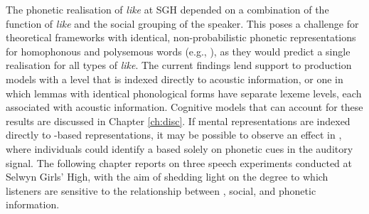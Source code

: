 The phonetic realisation of \textit{like} at SGH depended on a combination of the function of \textit{like} and the social grouping of the speaker. This poses a challenge for theoretical frameworks with identical, non-probabilistic phonetic representations for homophonous and polysemous words (e.g., \citealt{leveltetal1999}), as they would predict a single realisation for all types of \textit{like}. The current findings lend support to production models with a  level that is indexed directly to acoustic information, or one in which lemmas with identical phonological forms have separate lexeme levels, each associated with acoustic information. Cognitive models that can account for these results are discussed in Chapter \ref{ch:disc}. If mental representations are indexed directly to -based representations, it may be possible to observe an effect in , where individuals could identify a  based solely on phonetic cues in the auditory signal. The following chapter reports on three speech  experiments conducted at Selwyn Girls' High, with the aim of shedding light on the degree to which listeners are sensitive to the relationship between , social, and phonetic information.














